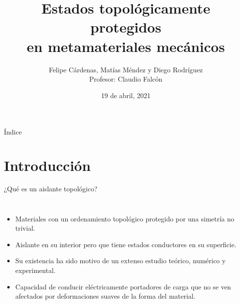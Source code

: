 \documentclass[aspectratio=43]{beamer}
\title[FI4105]{Estados topológicamente protegidos 
 \\ en metamateriales mecánicos} %
\subtitle{}
\author[M. Méndez]{Felipe Cárdenas, Matías Méndez y Diego Rodríguez
                  \\ Profesor: Claudio Falcón}
\institute[UCH]{
    Departamento de Física%
    \\%
    Universidad de Chile%
} %
\date{19 de abril, 2021}
\begin{document}
    
    \frame{\titlepage}
    
    \begin{frame}{Índice}
        \tableofcontents
    \end{frame}
     
     
     
     \section{Introducción}
     \begin{frame}{¿Qué es un aislante topológico?}
    

     \begin{columns}[c] %

        
    
     \begin{itemize}
     
         \item Materiales con un ordenamiento topológico protegido por una simetría no trivial.
         \item Aislante en su interior pero que tiene estados conductores en su superficie.
         \item Su existencia ha sido motivo de un extenso estudio teórico, numérico y experimental.
         \item Capacidad de conducir eléctricamente portadores de carga que no se ven afectados por deformaciones suaves de la forma del material.
     \end{itemize}
    


\end{columns}
\end{frame}
\end{document}
